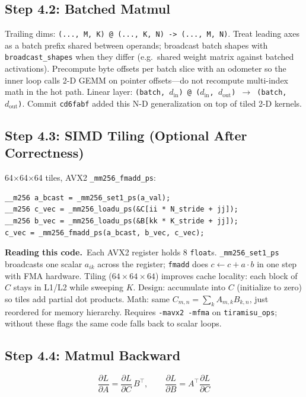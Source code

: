\documentclass[11pt,a4paper]{article}
\newcommand{\explain}{\par\smallskip\noindent}
\newcommand{\exhead}{\textbf{Reading this code.}\ }
\begin{document}
\subsection{Step 4.2: Batched Matmul}

Trailing dims: \texttt{(..., M, K) @ (..., K, N) -> (..., M, N)}. Treat leading axes as a batch
prefix shared between operands; broadcast batch shapes with \texttt{broadcast\_shapes} when
they differ (e.g.\ shared weight matrix against batched activations). Precompute byte offsets per
batch slice with an odometer so the inner loop calls 2-D GEMM on pointer offsets---do not
recompute multi-index math in the hot path. Linear layer:
\texttt{(batch, $d_\text{in}$) @ ($d_\text{in}$, $d_\text{out}$) $\rightarrow$ (batch, $d_\text{out}$)}.
Commit \texttt{cd6fabf} added this N-D generalization on top of tiled 2-D kernels.

\subsection{Step 4.3: SIMD Tiling (Optional After Correctness)}

64$\times$64$\times$64 tiles, AVX2 \texttt{\_mm256\_fmadd\_ps}:
\begin{lstlisting}[style=cpp]
__m256 a_bcast = _mm256_set1_ps(a_val);
__m256 c_vec = _mm256_loadu_ps(&C[ii * N_stride + jj]);
__m256 b_vec = _mm256_loadu_ps(&B[kk * K_stride + jj]);
c_vec = _mm256_fmadd_ps(a_bcast, b_vec, c_vec);
\end{lstlisting}
\explain\exhead Each AVX2 register holds 8 \texttt{float}s. \texttt{\_mm256\_set1\_ps} broadcasts
one scalar $a_{ik}$ across the register; \texttt{fmadd} does $c \leftarrow c + a \cdot b$ in one
step with FMA hardware. Tiling ($64\times64\times64$) improves cache locality: each block of $C$
stays in L1/L2 while sweeping $K$. Design: accumulate into $C$ (initialize to zero) so tiles add
partial dot products. Math: same $C_{m,n} = \sum_k A_{m,k}B_{k,n}$, just reordered for memory
hierarchy. Requires \texttt{-mavx2 -mfma} on \texttt{tiramisu\_ops}; without these flags the same
code falls back to scalar loops.

\subsection{Step 4.4: Matmul Backward}

\begin{equation}
  \frac{\partial L}{\partial A} = \frac{\partial L}{\partial C}\, B^\top, \qquad
  \frac{\partial L}{\partial B} = A^\top \frac{\partial L}{\partial C}
\end{equation}
\end{document}
